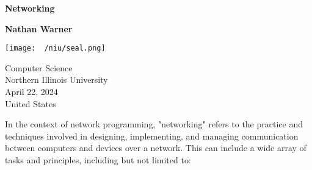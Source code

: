 \documentclass{report}
\title{\Huge{}}
\author{\huge{Nathan Warner}}
\date{\huge{}}
\begin{document}
        \begin{titlepage}
       \begin{center}
           \vspace*{1cm}
    
           \textbf{Networking}
    
           \vspace{0.5cm}
            
                
           \vspace{1.5cm}
    
           \textbf{Nathan Warner}
    
           \vfill
                
                
           \vspace{0.8cm}
         
           \texttt{[image: ~/niu/seal.png]}
                
           Computer Science \\
           Northern Illinois University\\
           April 22, 2024 \\
           United States\\
           
                
       \end{center}
    \end{titlepage}
    \tableofcontents
    \pagebreak 
    \bigbreak \noindent 
    \bigbreak \noindent 
    In the context of network programming, "networking" refers to the practice and techniques involved in designing, implementing, and managing communication between computers and devices over a network. This can include a wide array of tasks and principles, including but not limited to:
\end{document}
